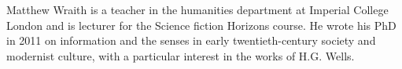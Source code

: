 Matthew Wraith is a teacher in the humanities department at Imperial College London and is lecturer for the Science fiction Horizons course. He wrote his PhD in 2011 on information and the senses in early twentieth-century society and modernist culture, with a particular interest in the works of H.G. Wells.